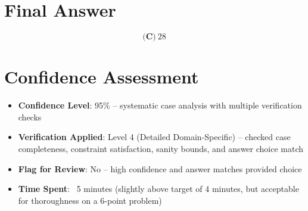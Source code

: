 \documentclass[]{article}
\begin{document}
\section*{Final Answer}
\[\boxed{\textbf{(C)}\ 28}\]

\section*{Confidence Assessment}
\begin{itemize}[leftmargin=*]
    \item \textbf{Confidence Level}: 95\% -- systematic case analysis with multiple verification checks
    \item \textbf{Verification Applied}: Level 4 (Detailed Domain-Specific) -- checked case completeness, constraint satisfaction, sanity bounds, and answer choice match
    \item \textbf{Flag for Review}: No -- high confidence and answer matches provided choice
    \item \textbf{Time Spent}: ~5 minutes (slightly above target of 4 minutes, but acceptable for thoroughness on a 6-point problem)
\end{itemize}
\end{document}
